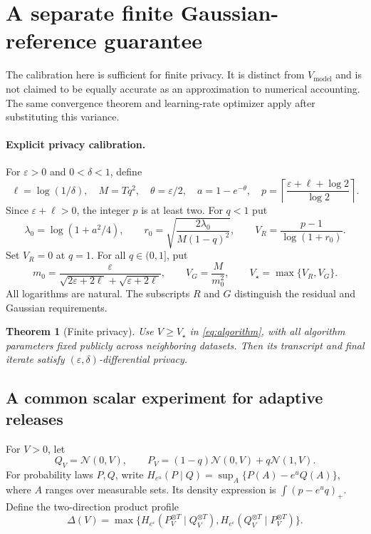\documentclass[11pt]{article}
\newtheorem{theorem}{Theorem}[section]
\newcommand{\N}{\mathcal N}
\begin{document}
\clearpage
\appendix
\section{A separate finite Gaussian-reference guarantee}\label{sec:privacy}

The calibration here is sufficient for finite privacy. It is distinct from
$V_{\mathrm{model}}$ and is not claimed to be equally accurate as an
approximation to numerical accounting. The same convergence theorem and
learning-rate optimizer apply after substituting this variance.

\paragraph{Explicit privacy calibration.}
For $\varepsilon>0$ and $0<\delta<1$, define
\begin{equation}\label{eq:order}
 \ell=\log(1/\delta),\quad M=Tq^2,\quad
 \theta=\varepsilon/2,\quad a=1-e^{-\theta},\quad
 p=\left\lceil\frac{\varepsilon+\ell+\log2}{\log2}\right\rceil.
\end{equation}
Since $\varepsilon+\ell>0$, the integer $p$ is at least two. For $q<1$ put
\begin{equation}\label{eq:residual-variance}
 \lambda_0=\log(1+a^2/4),\qquad
 r_0=\sqrt{\frac{2\lambda_0}{M(1-q)^2}},\qquad
 V_R=\frac{p-1}{\log(1+r_0)}.
\end{equation}
Set $V_R=0$ at $q=1$. For all $q\in(0,1]$, put
\begin{equation}\label{eq:gaussian-variance}
 m_0=\frac{\varepsilon}{\sqrt{2\varepsilon+2\ell}+\sqrt{\varepsilon+2\ell}},
 \qquad V_G=\frac{M}{m_0^2},\qquad V_\star=\max\{V_R,V_G\}.
\end{equation}
All logarithms are natural. The subscripts $R$ and $G$ distinguish the
residual and Gaussian requirements.

\begin{theorem}[Finite privacy]\label{thm:privacy}
Use $V\ge V_\star$ in \eqref{eq:algorithm}, with all algorithm parameters
fixed publicly across neighboring datasets. Then its transcript and final
iterate satisfy $(\varepsilon,\delta)$-differential privacy.
\end{theorem}



\subsection{A common scalar experiment for adaptive releases}
For $V>0$, let
\[
 Q_V=\N(0,V),\qquad P_V=(1-q)\N(0,V)+q\N(1,V).
\]
For probability laws $P,Q$, write
$H_{e^u}(P\mid Q)=\sup_A\{P(A)-e^uQ(A)\}$, where $A$ ranges over
measurable sets. Its density expression is $\int(p-e^u q)_+$.
Define the two-direction product profile
\[
 \Delta(V)=\max\{H_{e^\varepsilon}(P_V^{\otimes T}\mid Q_V^{\otimes T}),
                 H_{e^\varepsilon}(Q_V^{\otimes T}\mid P_V^{\otimes T})\}.
\]
\end{document}
